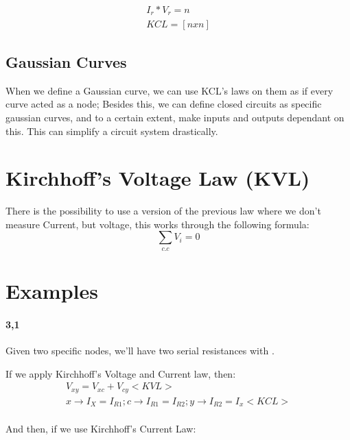 \documentclass[11pt,fleqn]{book} %
\begin{document}
\begin{gather}
    I_r * V_r = n\\
    KCL = [n x n]
\end{gather}

\subsection{Gaussian Curves}

When we define a Gaussian curve, we can use KCL's laws on them as if every curve acted
as a node; Besides this, we can define closed circuits as specific gaussian curves, and 
to a certain extent, make inputs and outputs dependant on this. This can simplify a circuit 
system drastically.

\section{Kirchhoff's Voltage Law (KVL)}

There is the possibility to use a version of the previous law where
we don't measure Current, but voltage, this works through the following formula:
$$\sum_{c.c}V_{i} = 0$$

\section{Examples}

\paragraph{3,1}

Given two specific nodes, we'll have two serial resistances with . 

If we apply Kirchhoff's Voltage and Current law, then:
\begin{gather}
    V_{xy} = V_{xc} + V_{cy} <KVL> \\
    x \to I_X = I_{R1} ; c \to I_{R1} = I_{R2} ; y \to I_{R2} = I_x <KCL> \\
    
\end{gather}

And then, if we use Kirchhoff's Current Law:
\end{document}
